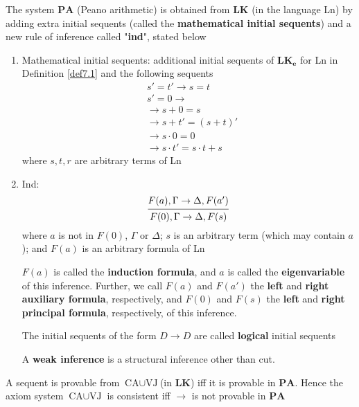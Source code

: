 \documentclass[11pt]{article}
\def \LK {\textbf{LK}}
\def \LKe {\textbf{LK}_\textbf{e}}
\def \CA {\text{CA}}
\def \VJ {\text{VJ}}
\def \PA {\textbf{PA}}
\begin{document}
\begin{definition}[]
The system \(\PA\) (Peano arithmetic) is obtained from \(\LK\) (in the language Ln) by adding
extra initial sequents (called the \textbf{mathematical initial sequents}) and a new rule of inference
called "\textbf{ind}", stated below
\begin{enumerate}
\item Mathematical initial sequents: additional initial sequents of \(\LKe\) for Ln in Definition
\ref{def7.1} and the following sequents
\begin{align*}
&s'=t' \to s=t\\
&s'=0 \to \\
& \to s+0 = s\\
& \to s+t'=(s+t)'\\
& \to s\cdot 0=0\\
& \to s\cdot t'=s\cdot t+s
\end{align*}
where \(s,t,r\) are arbitrary terms of Ln
\item Ind:
\begin{equation*}
\begin{prooftree}%
\hypo{F(a),\Gamma\to\Delta,F(a')}
\infer1{F(0),\Gamma\to\Delta,F(s)}
\end{prooftree}
\end{equation*}
where \(a\) is not in \(F(0)\), \(\Gamma\) or \(\Delta\); \(s\) is an arbitrary term (which may contain \(a\));
and \(F(a)\) is an arbitrary formula of Ln

\(F(a)\) is called the \textbf{induction formula}, and \(a\) is called the \textbf{eigenvariable} of this
inference. Further, we call \(F(a)\) and \(F(a')\) the \textbf{left} and \textbf{right auxiliary formula},
respectively, and \(F(0)\) and \(F(s)\) the \textbf{left} and \textbf{right principal formula}, respectively, of
this inference.

The initial sequents of the form \(D\to D\) are called \textbf{logical} initial sequents

A \textbf{weak inference} is a structural inference other than cut.
\end{enumerate}
\end{definition}

\begin{proposition}[]
A sequent is provable from \(\CA\cup\VJ\)(in \(\LK\)) iff it is provable in \(\PA\). Hence the
axiom system \(\CA\cup\VJ\) is consistent iff \(\to\) is not provable in \(\PA\)
\end{proposition}
\end{document}
